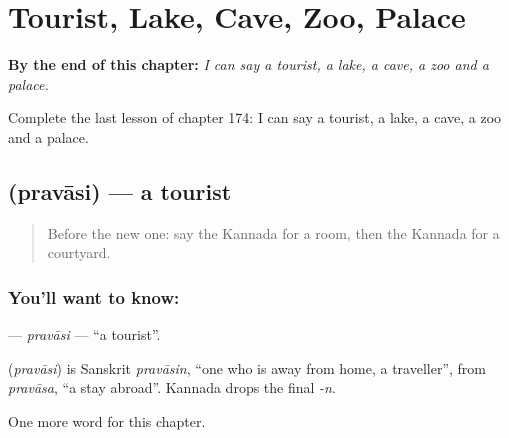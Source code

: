 
\chapter{Tourist, Lake, Cave, Zoo, Palace}
\label{ch:ka-tourist-lake-cave-zoo-palace}

\begin{chapteropening}
\textbf{By the end of this chapter:} \emph{I can say a tourist, a lake, a cave, a zoo and a palace.}

Complete the last lesson of chapter 174: I can say a tourist, a lake, a cave, a zoo and a palace.
\end{chapteropening}

\section[\texorpdfstring{\kn{ಪ್ರವಾಸಿ} (pravāsi)}{ಪ್ರವಾಸಿ (pravāsi)}]{ (pravāsi) — a tourist}

\label{lesson:KA-C174-pravasi}



\begin{quote}
Before the new one: say the Kannada for a room, then the Kannada for a courtyard.
\end{quote}

\subsection*{You'll want to know: }
\textbf{} — \emph{pravāsi} — \textquotedblleft{}a tourist\textquotedblright{}.

\begin{cousinweb}
\textbf{} (\emph{pravāsi}) is Sanskrit \emph{pravāsin}, \textquotedblleft{}one who is away from home, a traveller\textquotedblright{}, from \emph{pravāsa}, \textquotedblleft{}a stay abroad\textquotedblright{}. Kannada drops the final \emph{-n}.
\end{cousinweb}

\begin{grammarlens}[title={What you've built}]
One more word for this chapter.
\end{grammarlens}

